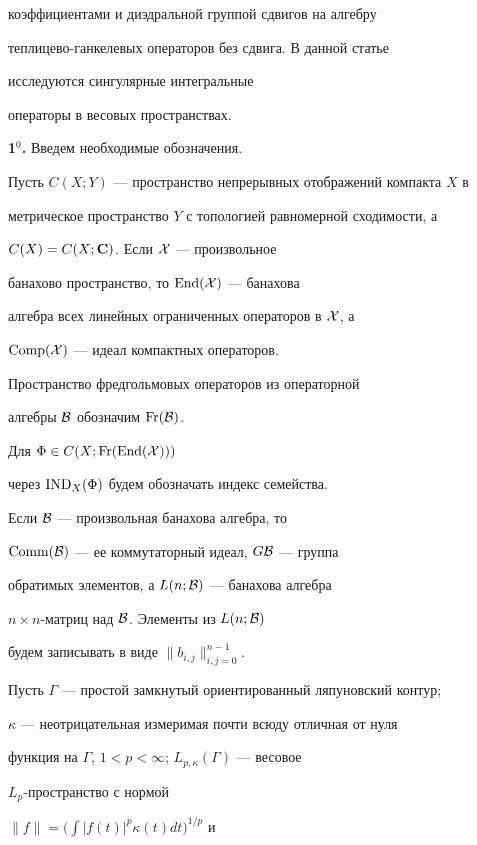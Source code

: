 коэффициентами и диэдральной группой сдвигов на алгебру


теплицево-ганкелевых операторов без сдвига. В данной статье


исследуются сингулярные интегральные


операторы в весовых пространствах.


\medskip





{\bf 1$^0$.} Введем необходимые обозначения.


Пусть $C(X;Y)$ --- пространство непрерывных отображений компакта $X$ в


метрическое пространство $Y$ с топологией равномерной сходимости, а


$C(X)=C(X;{\bold C})$. Если ${\cal X}$ --- произвольное


банахово пространство, то $\operatorname{End}({\cal X})$ --- банахова


алгебра всех линейных ограниченных операторов в ${\cal X}$, а


$\operatorname{Comp}({\cal X})$ --- идеал компактных операторов.


Пространство фредгольмовых операторов из операторной


алгебры ${\cal B}$ обозначим $\operatorname{Fr}({\cal B})$.


Для $\Phi \in C(X;\operatorname{Fr}(\operatorname{End}({\cal X})))$


через $\operatorname{IND}_X(\Phi)$ будем обозначать индекс семейства.


Если ${\cal B}$ --- произвольная банахова алгебра, то


$\operatorname{Comm}({\cal B})$ --- ее коммутаторный идеал, $G{\cal B}$ --- группа


обратимых элементов, а $L(n;{\cal B})$ --- банахова алгебра


$n\times n$-матриц над ${\cal B}$. Элементы из $L(n;{\cal B})$


будем записывать в виде $\|b_{i,j}\|_{i,j=0}^{n-1}$.





Пусть $\Gamma$ --- простой замкнутый ориентированный ляпуновский контур;


$\kappa$ --- неотрицательная измеримая почти всюду отличная от нуля


функция на $\Gamma$, $1<p<\infty$; $L_{p,\kappa}(\Gamma)$ --- весовое


$L_p$-пространство с нормой


$\|f\|=\Big({\displaystyle \int} |f(t)|^p\kappa (t)dt\Big)^{1/p}$ и


